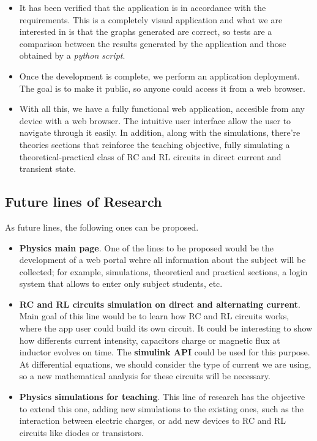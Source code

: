 \documentclass[../main.tex]{subfiles}
\begin{document}
\begin{itemize}
    \item It has been verified that the application is in accordance with the requirements. This is a completely visual application and what we are interested in is that the graphs generated are correct, so tests are a comparison between the results generated by the application and those obtained by a \textit{python script}.
    
    \item Once the development is complete, we perform an application deployment. The goal is to make it public, so anyone could access it from a web browser.
    
    \item With all this, we have a fully functional web application, accesible from any device with a web browser. The intuitive user interface allow the user to navigate through it easily. In addition, along with the simulations, there're theories sections that reinforce the teaching objective, fully simulating a theoretical-practical class of RC and RL circuits in direct current and transient state.

    


\end{itemize}



\subsection{Future lines of Research}
As future lines, the following ones can be proposed.

\begin{itemize}
    \item \textbf{Physics main page}. One of the lines to be proposed would be the development of a web portal wehre all information about the subject will be collected; for example, simulations, theoretical and practical sections, a login system that allows to enter only subject students, etc.
    
    \item \textbf{RC and RL circuits simulation on direct and alternating current}. Main goal of this line would be to learn how RC and RL circuits works, where the app user could build its own circuit. It could be interesting to show how differents current intensity, capacitors charge or magnetic flux at inductor evolves on time. The \textbf{simulink API} could be used for this purpose. At differential equations, we should consider the type of current we are using, so a new mathematical analysis for these circuits will be necessary. 
    
    \item \textbf{Physics simulations for teaching}. This line of research has the objective to extend this one, adding new simulations to the existing ones, such as the interaction between electric charges, or add new devices to RC and RL circuits like diodes or transistors.
\end{itemize}
\end{document}
